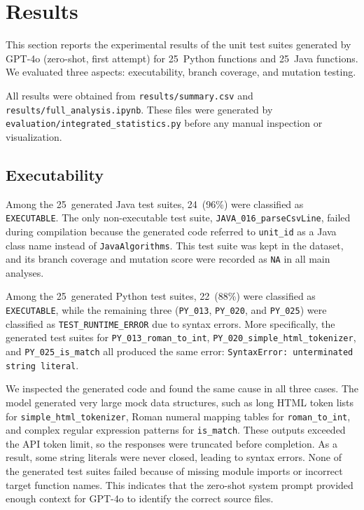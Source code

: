 \documentclass[conference]{IEEEtran}
\begin{document}
\section{Results}
\label{sec:results}

This section reports the experimental results of the unit test suites generated by GPT-4o (zero-shot, first attempt) for 25~Python functions and 25~Java functions. We evaluated three aspects: executability, branch coverage, and mutation testing.

All results were obtained from \texttt{results/summary.csv} and \texttt{results/full\_analysis.ipynb}. These files were generated by \texttt{evaluation/integrated\_statistics.py} before any manual inspection or visualization.

\subsection{Executability}
\label{subsec:exec_results}

Among the 25~generated Java test suites, 24~(96\%) were classified as \texttt{EXECUTABLE}. The only non-executable test suite, \texttt{JAVA\_016\_parseCsvLine}, failed during compilation because the generated code referred to \texttt{unit\_id} as a Java class name instead of \texttt{JavaAlgorithms}. This test suite was kept in the dataset, and its branch coverage and mutation score were recorded as \texttt{NA} in all main analyses.

Among the 25~generated Python test suites, 22~(88\%) were classified as \texttt{EXECUTABLE}, while the remaining three (\texttt{PY\_013}, \texttt{PY\_020}, and \texttt{PY\_025}) were classified as \texttt{TEST\_RUNTIME\_ERROR} due to syntax errors.
More specifically, the generated test suites for \texttt{PY\_013\_roman\_to\_int}, \texttt{PY\_020\_simple\_html\_tokenizer}, and \texttt{PY\_025\_is\_match} all produced the same error: \texttt{SyntaxError: unterminated string literal}.

We inspected the generated code and found the same cause in all three cases. The model generated very large mock data structures, such as long HTML token lists for \texttt{simple\_html\_tokenizer}, Roman numeral mapping tables for \texttt{roman\_to\_int}, and complex regular expression patterns for \texttt{is\_match}. These outputs exceeded the API token limit, so the responses were truncated before completion. As a result, some string literals were never closed, leading to syntax errors.
None of the generated test suites failed because of missing module imports or incorrect target function names. This indicates that the zero-shot system prompt provided enough context for GPT-4o to identify the correct source files.
\end{document}
